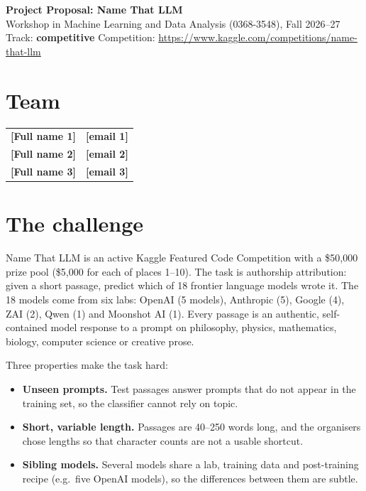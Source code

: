 \documentclass[11pt]{article}
\newcommand{\todo}[1]{\textbf{[#1]}}
\begin{document}
\begin{center}
  {\Large\bfseries Project Proposal: Name That LLM}\\[4pt]
  Workshop in Machine Learning and Data Analysis (0368-3548), Fall 2026--27\\[2pt]
  Track: \textbf{competitive} \quad
  Competition: \url{https://www.kaggle.com/competitions/name-that-llm}
\end{center}

\section*{Team}
\begin{tabular}{@{}ll@{}}
  \todo{Full name 1} & \todo{email 1} \\
  \todo{Full name 2} & \todo{email 2} \\
  \todo{Full name 3} & \todo{email 3} \\
\end{tabular}

\section*{The challenge}
Name That LLM is an active Kaggle Featured Code Competition with a \$50{,}000 prize pool
(\$5{,}000 for each of places 1--10). The task is authorship attribution: given a short passage,
predict which of 18 frontier language models wrote it. The 18 models come from six labs:
OpenAI (5 models), Anthropic (5), Google (4), ZAI (2), Qwen (1) and Moonshot AI (1).
Every passage is an authentic, self-contained model response to a prompt on philosophy,
physics, mathematics, biology, computer science or creative prose.

Three properties make the task hard:
\begin{itemize}
  \item \textbf{Unseen prompts.} Test passages answer prompts that do not appear in the
        training set, so the classifier cannot rely on topic.
  \item \textbf{Short, variable length.} Passages are 40--250 words long, and the organisers
        chose lengths so that character counts are not a usable shortcut.
  \item \textbf{Sibling models.} Several models share a lab, training data and post-training
        recipe (e.g.\ five OpenAI models), so the differences between them are subtle.
\end{itemize}
\end{document}
